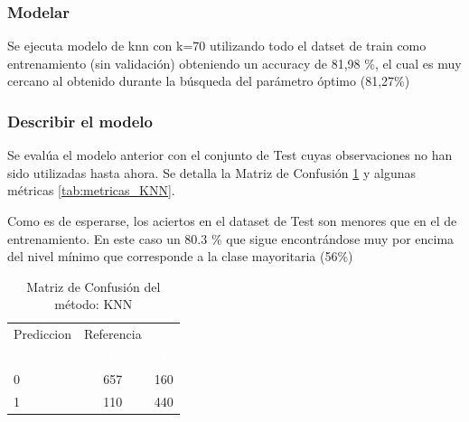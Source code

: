 \subsubsection{Modelar}

Se ejecuta modelo de knn con k=70 utilizando todo el datset de train como entrenamiento (sin validación) obteniendo un accuracy de 81,98 \%, el cual es muy cercano al obtenido durante la búsqueda del parámetro óptimo (81,27\%)

\subsubsection{Describir el modelo}

Se evalúa el modelo anterior con el conjunto de Test cuyas observaciones no han sido utilizadas hasta ahora. Se detalla la Matriz de Confusión \ref{tab:MatrizConf_KNN} y algunas métricas \ref{tab:metricas_KNN}.

Como es de esperarse, los aciertos en el dataset de Test son menores que en el de entrenamiento. En este caso un 80.3 \% que sigue encontrándose muy por encima del nivel mínimo que corresponde a la
clase mayoritaria (56\%)



\begin{table}[!h]
	
	\caption{\label{tab:MatrizConf_KNN}Matriz de Confusión del método: KNN }
	\centering
	\begin{tabular}[t]{lcc}
		\toprule
		\multicolumn{1}{c}{Prediccion} & \multicolumn{1}{c}{Referencia} & \multicolumn{1}{c}{ } \\
		\cmidrule(l{3pt}r{3pt}){1-1} \cmidrule(l{3pt}r{3pt}){2-2}
		\rowcolor{black}  \multicolumn{1}{c}{\textcolor{white}{\textbf{ }}} & \multicolumn{1}{c}{\textcolor{white}{\textbf{0}}} & \multicolumn{1}{c}{\textcolor{white}{\textbf{1}}}\\
		\midrule
		\rowcolor{gray!6}  0 & 657 & 160\\
		1 & 110 & 440\\
		\bottomrule
	\end{tabular}
\end{table}

